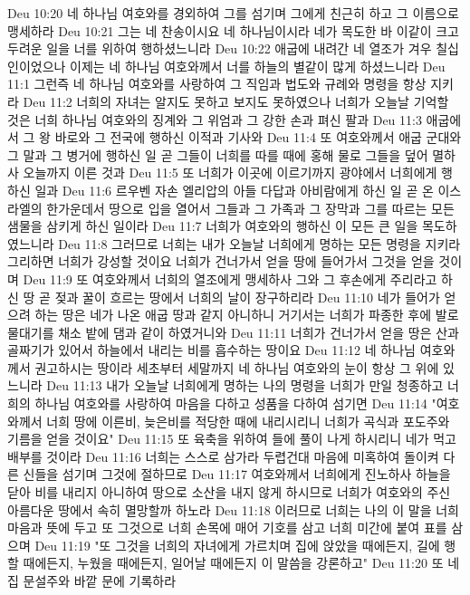 Deu 10:20  네 하나님 여호와를 경외하여 그를 섬기며 그에게 친근히 하고 그 이름으로 맹세하라
Deu 10:21  그는 네 찬송이시요 네 하나님이시라 네가 목도한 바 이같이 크고 두려운 일을 너를 위하여 행하셨느니라
Deu 10:22  애굽에 내려간 네 열조가 겨우 칠십인이었으나 이제는 네 하나님 여호와께서 너를 하늘의 별같이 많게 하셨느니라
Deu 11:1  그런즉 네 하나님 여호와를 사랑하여 그 직임과 법도와 규례와 명령을 항상 지키라
Deu 11:2  너희의 자녀는 알지도 못하고 보지도 못하였으나 너희가 오늘날 기억할 것은 너희 하나님 여호와의 징계와 그 위엄과 그 강한 손과 펴신 팔과
Deu 11:3  애굽에서 그 왕 바로와 그 전국에 행하신 이적과 기사와
Deu 11:4  또 여호와께서 애굽 군대와 그 말과 그 병거에 행하신 일 곧 그들이 너희를 따를 때에 홍해 물로 그들을 덮어 멸하사 오늘까지 이른 것과
Deu 11:5  또 너희가 이곳에 이르기까지 광야에서 너희에게 행하신 일과
Deu 11:6  르우벤 자손 엘리압의 아들 다답과 아비람에게 하신 일 곧 온 이스라엘의 한가운데서 땅으로 입을 열어서 그들과 그 가족과 그 장막과 그를 따르는 모든 샘물을 삼키게 하신 일이라
Deu 11:7  너희가 여호와의 행하신 이 모든 큰 일을 목도하였느니라
Deu 11:8  그러므로 너희는 내가 오늘날 너희에게 명하는 모든 명령을 지키라 그리하면 너희가 강성할 것이요 너희가 건너가서 얻을 땅에 들어가서 그것을 얻을 것이며
Deu 11:9  또 여호와께서 너희의 열조에게 맹세하사 그와 그 후손에게 주리라고 하신 땅 곧 젖과 꿀이 흐르는 땅에서 너희의 날이 장구하리라
Deu 11:10  네가 들어가 얻으려 하는 땅은 네가 나온 애굽 땅과 같지 아니하니 거기서는 너희가 파종한 후에 발로 물대기를 채소 밭에 댐과 같이 하였거니와
Deu 11:11  너희가 건너가서 얻을 땅은 산과 골짜기가 있어서 하늘에서 내리는 비를 흡수하는 땅이요
Deu 11:12  네 하나님 여호와께서 권고하시는 땅이라 세초부터 세말까지 네 하나님 여호와의 눈이 항상 그 위에 있느니라
Deu 11:13  내가 오늘날 너희에게 명하는 나의 명령을 너희가 만일 청종하고 너희의 하나님 여호와를 사랑하여 마음을 다하고 성품을 다하여 섬기면
Deu 11:14  "여호와께서 너희 땅에 이른비, 늦은비를 적당한 때에 내리시리니 너희가 곡식과 포도주와 기름을 얻을 것이요"
Deu 11:15  또 육축을 위하여 들에 풀이 나게 하시리니 네가 먹고 배부를 것이라
Deu 11:16  너희는 스스로 삼가라 두렵건대 마음에 미혹하여 돌이켜 다른 신들을 섬기며 그것에 절하므로
Deu 11:17  여호와께서 너희에게 진노하사 하늘을 닫아 비를 내리지 아니하여 땅으로 소산을 내지 않게 하시므로 너희가 여호와의 주신 아름다운 땅에서 속히 멸망할까 하노라
Deu 11:18  이러므로 너희는 나의 이 말을 너희 마음과 뜻에 두고 또 그것으로 너희 손목에 매어 기호를 삼고 너희 미간에 붙여 표를 삼으며
Deu 11:19  "또 그것을 너희의 자녀에게 가르치며 집에 앉았을 때에든지, 길에 행할 때에든지, 누웠을 때에든지, 일어날 때에든지 이 말씀을 강론하고"
Deu 11:20  또 네 집 문설주와 바깥 문에 기록하라

